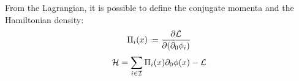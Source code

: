 From the Lagrangian, it is possible to define the conjugate momenta and the Hamiltonian density:
\begin{equation}
  \Pi_i(x) \defeq \frac{\pa \mathcal{L}}{\pa (\pa_0 \phi_i)}
  \label{eq:1.30xxxxxxxxxxxxxxxxxxxxxx}
\end{equation}
\begin{equation}
  \mathcal{H} = \sum_{i \in \mathcal{I}} \Pi_i(x) \partial_0 \phi(x) - \mathcal{L}
  \label{eq:1.31xxxxxxxxxxxxxxxxxxxxxxxx}
\end{equation}










